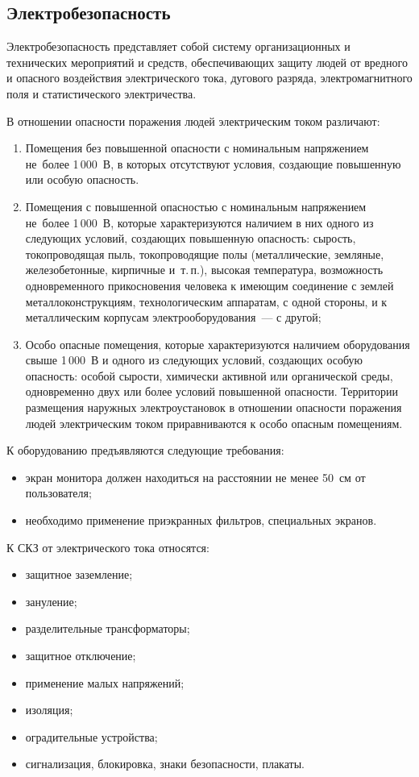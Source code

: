 \subsection{Электробезопасность}

Электробезопасность представляет собой систему организационных и технических мероприятий и средств, обеспечивающих защиту людей от вредного и опасного воздействия электрического тока, дугового разряда, электромагнитного поля и статистического электричества.

В отношении опасности поражения людей электрическим током различают:
\begin{enumerate}
[leftmargin=0pt,itemindent=\parindent+\labelwidth+\labelsep]
    \item Помещения без повышенной опасности с номинальным напряжением не~более 1\,000~В, в которых отсутствуют условия, создающие повышенную или особую опасность.
    \item Помещения с повышенной опасностью с номинальным напряжением не~более 1\,000~В, которые характеризуются наличием в них одного из следующих условий, создающих повышенную опасность: сырость, токопроводящая пыль, токопроводящие полы (металлические, земляные, железобетонные, кирпичные и~т.\,п.), высокая температура, возможность одновременного прикосновения человека к имеющим соединение с землей металлоконструкциям, технологическим аппаратам, с одной стороны, и к металлическим корпусам электрооборудования~--- с другой;
    \item Особо опасные помещения, которые характеризуются наличием оборудования свыше 1\,000~В и одного из следующих условий, создающих особую опасность: особой сырости, химически активной или органической среды, одновременно двух или более условий повышенной опасности. 
    Территории размещения наружных электроустановок в отношении опасности поражения людей электрическим током приравниваются к особо опасным помещениям.
\end{enumerate}

К оборудованию предъявляются следующие требования:
\begin{itemize}
    \item экран монитора должен находиться на расстоянии не менее 50~см от пользователя;
    \item необходимо применение приэкранных фильтров, специальных экранов.
\end{itemize}

К СКЗ от электрического тока относятся:
\begin{itemize}
    \item защитное заземление;
    \item зануление;
    \item разделительные трансформаторы;
    \item защитное отключение;
    \item применение малых напряжений;
    \item изоляция;
    \item оградительные устройства;
    \item сигнализация, блокировка, знаки безопасности, плакаты.
\end{itemize}

